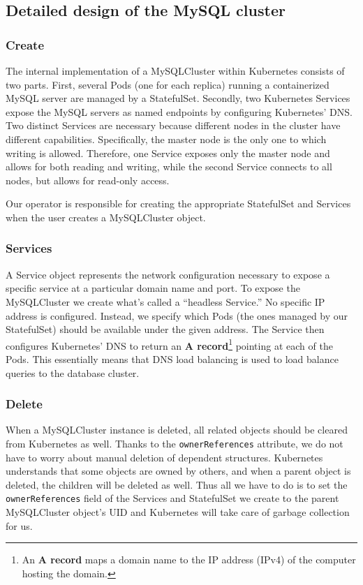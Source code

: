 \subsection{Detailed design of the MySQL cluster}

\subsubsection*{Create}
The internal implementation of a MySQLCluster within Kubernetes consists of two parts. First,
several Pods (one for each replica) running a containerized MySQL server are managed by a
StatefulSet. Secondly, two Kubernetes Services expose the MySQL servers as named endpoints by
configuring Kubernetes’ DNS. Two distinct Services are necessary because different nodes in the
cluster have different capabilities. Specifically, the master node is the only one to which writing
is allowed. Therefore, one Service exposes only the  master node and allows for both reading and
writing, while the second Service connects to all nodes, but allows for read-only access.

Our operator is responsible for creating the appropriate StatefulSet and Services when the user
creates a MySQLCluster object.

\subsubsection*{Services}
A Service object represents the network configuration necessary to expose a specific service at a
particular domain name and port. To expose the MySQLCluster we create what’s called a
“headless Service.” No specific IP address is configured. Instead, we specify which Pods (the ones
managed by our StatefulSet) should be available under the given address. The Service then configures
Kubernetes’ DNS to return an \textbf{A record}\footnote{An \textbf{A record} maps a domain name to
the IP address (IPv4) of the computer hosting the domain.} pointing at each of the Pods. This
essentially means that DNS load balancing is used to load balance queries to the database cluster.

\subsubsection*{Delete}
When a MySQLCluster instance is deleted, all related objects should be cleared from Kubernetes
as well. Thanks to the \texttt{ownerReferences} attribute, we do not have to worry about manual
deletion of dependent structures. Kubernetes understands that some objects are owned by others, and
when a parent object is deleted, the children will be deleted as well. Thus all we have to do is to set
the \texttt{ownerReferences} field of the Services and StatefulSet we create to the parent
MySQLCluster object’s UID and Kubernetes will take care of garbage collection for us.

